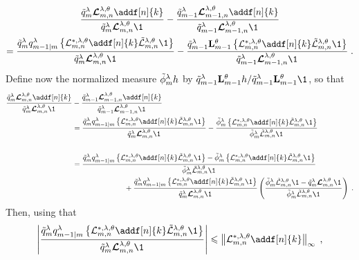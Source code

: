 \documentclass{article}
\begin{document}
\begin{multline*}
 \frac{\ivd{m} \retrokmod_{m, n} \addf[n]{k}}{\ivd{m} \retrokmod_{m, n} \1_{}} - \frac{\ivd{m - 1} \retrokmod_{m - 1, n} \addf[n]{k}}{\ivd{m - 1} \retrokmod_{m - 1, n} \1_{}}  \\= \frac{\ivd{m} \kvd{m-1 \vert m} \left\{\mathcal{L}^{*,\parvar,\parvec}_{m, n} \addf[n]{k}\tilde{\mathcal{L}}^{\parvar,\parvec}_{m, n} \1\right\}}{\ivd{m} \retrokmod_{m, n} \1_{}} - \frac{\ivd{m - 1} \uk{m-1}{\parvec} \left\{\mathcal{L}^{*,\parvar,\parvec}_{m, n} \addf[n]{k}\tilde{\mathcal{L}}^{\parvar,\parvec}_{m, n} \1\right\}}{\ivd{m - 1} \retrokmod_{m - 1, n} \1_{}}\eqsp. 
\end{multline*}
Define now the normalized measure $\tilde\phi^\lambda_mh$ by $\ivd{m - 1} \uk{m-1}{\parvec}h/\ivd{m - 1} \uk{m-1}{\parvec}\1$, so that
\begin{align*}
 \frac{\ivd{m} \retrokmod_{m, n} \addf[n]{k}}{\ivd{m} \retrokmod_{m, n} \1_{}} &- \frac{\ivd{m - 1} \retrokmod_{m - 1, n} \addf[n]{k}}{\ivd{m - 1} \retrokmod_{m - 1, n} \1_{}}  \\
&=  \frac{\ivd{m} \kvd{m-1 \vert m} \left\{\mathcal{L}^{*,\parvar,\parvec}_{m, n} \addf[n]{k}\tilde{\mathcal{L}}^{\parvar,\parvec}_{m, n} \1\right\}}{\ivd{m} \retrokmod_{m, n} \1_{}} - \frac{\tilde\phi^\parvar_m\left\{\mathcal{L}^{*,\parvar,\parvec}_{m, n} \addf[n]{k}\tilde{\mathcal{L}}^{\parvar,\parvec}_{m, n} \1\right\}}{\tilde\phi^\parvar_m\tilde{\mathcal{L}}^{\parvar,\parvec}_{m, n}\1_{}} \\ \\
&= \frac{\ivd{m} \kvd{m-1 \vert m} \left\{\mathcal{L}^{*,\parvar,\parvec}_{m, n} \addf[n]{k}\tilde{\mathcal{L}}^{\parvar,\parvec}_{m, n} \1\right\} - \tilde\phi^\parvar_m \left\{\mathcal{L}^{*,\parvar,\parvec}_{m, n} \addf[n]{k}\tilde{\mathcal{L}}^{\parvar,\parvec}_{m, n} \1\right\}}{\tilde\phi^\parvar_m\tilde{\mathcal{L}}^{\parvar,\parvec}_{m, n}\1_{}} \\
&\hspace{2.5cm}+  \frac{\ivd{m} \kvd{m-1 \vert m}\left\{\mathcal{L}^{*,\parvar,\parvec}_{m, n} \addf[n]{k}\tilde{\mathcal{L}}^{\parvar,\parvec}_{m, n} \1\right\}}{\ivd{m} \retrokmod_{m, n} \1_{}}\left(\frac{\tilde\phi^\parvar_m\tilde{\mathcal{L}}^{\parvar,\parvec}_{m, n}\1-\ivd{m} \retrokmod_{m, n} \1_{}}{\tilde\phi^\parvar_m\tilde{\mathcal{L}}^{\parvar,\parvec}_{m, n}\1_{}}\right)\eqsp.
\end{align*}
Then, using that
$$
\left|\frac{\ivd{m} \kvd{m-1 \vert m} \left\{\mathcal{L}^{*,\parvar,\parvec}_{m, n} \addf[n]{k}\tilde{\mathcal{L}}^{\parvar,\parvec}_{m, n} \1\right\}}{\ivd{m} \retrokmod_{m, n} \1_{}}\right|\leqslant \left\|\mathcal{L}^{*,\parvar,\parvec}_{m, n} \addf[n]{k}\right\|_\infty\eqsp,
$$
\end{document}
